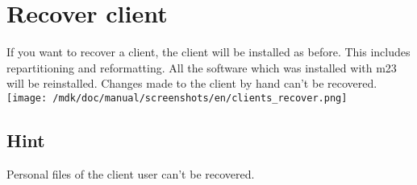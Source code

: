 \section{Recover client}If you want to recover a client, the client will be installed as before. This includes repartitioning and reformatting. All the software which was installed with m23 will be reinstalled. Changes made to the client by hand can't be recovered.\\
\texttt{[image: /mdk/doc/manual/screenshots/en/clients\_recover.png]} \\
\subsection{Hint}
Personal files of the client user can't be recovered.\\
